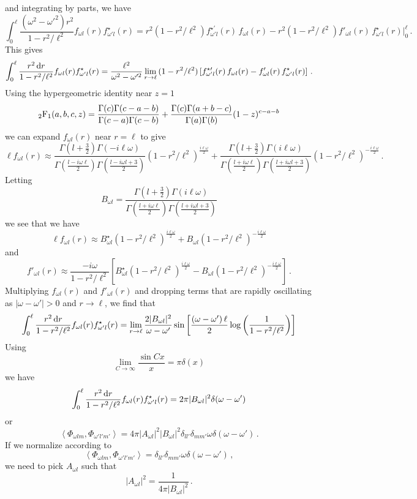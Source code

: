 \documentclass{brownthesis}
\def\dd{{\rm d}}
\begin{document}
and integrating by parts, we have
\[
\int_{0}^{\ell}\frac{(\omega^{2}-\omega'^{2})r^{2}}{1-r^{2}/\ell^{2}}f_{\omega l}(r)f_{\omega'l}^{\star}(r)=r^{2}(1-r^{2}/\ell^{2})f_{\omega'l}^{\star\prime}(r)\,f_{\omega l}(r)-r^{2}(1-r^{2}/\ell^{2})f'_{\omega l}(r)\,f_{\omega'l}^{\star}(r)\Big|_{0}^{\ell}\,.
\]
This gives
\[
\int_{0}^{\ell}\frac{r^{2}\,\dd r}{1-r^{2}/\ell^{2}}f_{\omega l}(r)f_{\omega'l}^{\star}(r)=\frac{\ell^{2}}{\omega^{2}-\omega'^{2}}\lim_{r\to\ell}\,(1-r^{2}/\ell^{2})\left[f_{\omega'l}^{\star\prime}(r)\,f_{\omega l}(r)-f'_{\omega l}(r)\,f_{\omega'l}^{\star}(r)\right]\,.
\]
Using the hypergeometric identity near $z=1$
\[
_{2}{\rm F}_{1}(a,b,c,z)=\frac{\Gamma(c)\Gamma(c-a-b)}{\Gamma(c-a)\Gamma(c-b)}+\frac{\Gamma(c)\Gamma(a+b-c)}{\Gamma(a)\Gamma(b)}(1-z)^{c-a-b}
\]
we can expand $f_{\omega l}(r)$ near $r=\ell$ to give
\[
\ell f_{\omega l}(r)\approx\frac{\Gamma(l+\frac{3}{2})\Gamma(-i\ell\omega)}{\Gamma\left(\frac{l-i\omega\ell}{2}\right)\Gamma\left(\frac{l-i\omega l+3}{2}\right)}(1-r^{2}/\ell^{2})^{\frac{i\ell\omega}{2}}+\frac{\Gamma(l+\frac{3}{2})\Gamma(i\ell\omega)}{\Gamma\left(\frac{l+i\omega\ell}{2}\right)\Gamma\left(\frac{l+i\omega l+3}{2}\right)}(1-r^{2}/\ell^{2})^{-\frac{i\ell\omega}{2}}\,.
\]
Letting
\[
B_{\omega l}=\frac{\Gamma(l+\frac{3}{2})\Gamma(i\ell\omega)}{\Gamma\left(\frac{l+i\omega\ell}{2}\right)\Gamma\left(\frac{l+i\omega l+3}{2}\right)}
\]
we see that we have
\[
\ell f_{\omega l}(r)\approx B_{\omega l}^{\star}(1-r^{2}/\ell^{2})^{\frac{i\ell\omega}{2}}+B_{\omega l}(1-r^{2}/\ell^{2})^{-\frac{i\ell\omega}{2}}
\]
and
\[
f'_{\omega l}(r)\approx\frac{-i\omega}{1-r^{2}/\ell^{2}}\left[B_{\omega l}^{\star}(1-r^{2}/\ell^{2})^{\frac{i\ell\omega}{2}}-B_{\omega l}(1-r^{2}/\ell^{2})^{-\frac{i\ell\omega}{2}}\right]\,.
\]
Multiplying $f_{\omega l}(r)$ and $f'_{\omega l}(r)$ and dropping
terms that are rapidly oscillating as $|\omega-\omega'|>0$ and $r\to\ell$,
we find that
\begin{equation}
\int_{0}^{\ell}\frac{r^{2}\,\dd r}{1-r^{2}/\ell^{2}}f_{\omega l}(r)f_{\omega'l}^{\star}(r)=\lim_{r\to\ell}\frac{2|B_{\omega l}|^{2}}{\omega-\omega'}\sin\left[\frac{\left(\omega-\omega'\right)\ell}{2}\log\left(\frac{1}{1-r^{2}/\ell^{2}}\right)\right]\label{eq:radialint}
\end{equation}
Using
\[
\lim_{C\to\infty}\frac{\sin Cx}{x}=\pi\delta(x)
\]
we have
\[
\int_{0}^{\ell}\frac{r^{2}\,\dd r}{1-r^{2}/\ell^{2}}f_{\omega l}(r)f_{\omega'l}^{\star}(r)=2\pi|B_{\omega l}|^{2}\delta(\omega-\omega')
\]
or
\begin{equation}
\left\langle \Phi_{\omega lm},\Phi_{\omega'l'm'}\right\rangle =4\pi|A_{\omega l}|^{2}|B_{\omega l}|^{2}\delta_{ll'}\delta_{mm'}\omega\delta(\omega-\omega')\,.\label{eq:staticnorm}
\end{equation}
If we normalize according to
\[
\left\langle \Phi_{\omega lm},\Phi_{\omega'l'm'}\right\rangle =\delta_{ll'}\delta_{mm'}\omega\delta(\omega-\omega')\,,
\]
we need to pick $A_{\omega l}$ such that
\[
|A_{\omega l}|^{2}=\frac{1}{4\pi|B_{\omega l}|^{2}}\,.
\]
\end{document}
